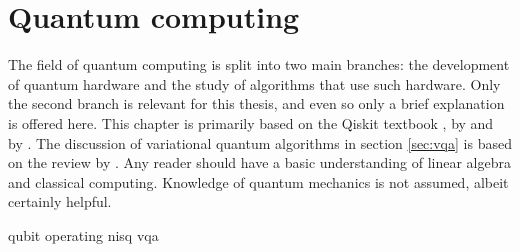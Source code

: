 \chapter{Quantum computing}
\label{chap:qc}
The field of quantum computing is split into two main branches: the development of quantum hardware and the study of algorithms that use such hardware.
Only the second branch is relevant for this thesis, and even so only a brief explanation is offered here.
This chapter is primarily based on the Qiskit textbook \cite{qiskit_textbook},  by \textcite{textbook_2nd} and  by \textcite{nielsenchuang}.
The discussion of variational quantum algorithms in section \ref{sec:vqa} is based on the review by \textcite{cerezo2021}.
Any reader should have a basic understanding of linear algebra and classical computing.
Knowledge of quantum mechanics is not assumed, albeit certainly helpful.

{qubit}
{operating}
{nisq}
{vqa}




